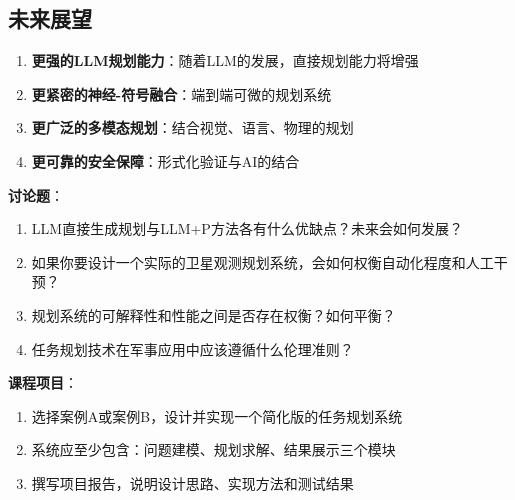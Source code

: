 \subsection*{未来展望}

\begin{enumerate}[leftmargin=2em]
  \item \textbf{更强的LLM规划能力}：随着LLM的发展，直接规划能力将增强
  \item \textbf{更紧密的神经-符号融合}：端到端可微的规划系统
  \item \textbf{更广泛的多模态规划}：结合视觉、语言、物理的规划
  \item \textbf{更可靠的安全保障}：形式化验证与AI的结合
\end{enumerate}

\begin{discussbox}
\textbf{讨论题}：
\begin{enumerate}
  \item LLM直接生成规划与LLM+P方法各有什么优缺点？未来会如何发展？
  \item 如果你要设计一个实际的卫星观测规划系统，会如何权衡自动化程度和人工干预？
  \item 规划系统的可解释性和性能之间是否存在权衡？如何平衡？
  \item 任务规划技术在军事应用中应该遵循什么伦理准则？
\end{enumerate}

\textbf{课程项目}：
\begin{enumerate}
  \item 选择案例A或案例B，设计并实现一个简化版的任务规划系统
  \item 系统应至少包含：问题建模、规划求解、结果展示三个模块
  \item 撰写项目报告，说明设计思路、实现方法和测试结果
\end{enumerate}
\end{discussbox}
